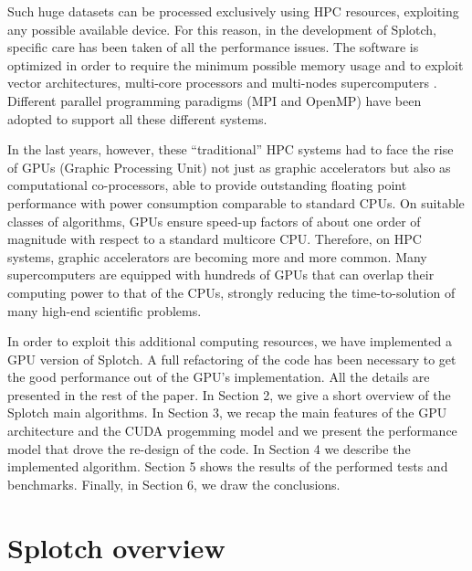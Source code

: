 \documentclass[11pt]{article}
\begin{document}

Such huge datasets can be processed exclusively using HPC resources, exploiting
any possible available device. For this reason, 
in the development of Splotch, specific care has been taken of all the performance 
issues. The software is optimized in order to require the minimum possible
memory usage and to exploit vector architectures, multi-core processors 
and multi-nodes supercomputers \cite{jin:high-performance}. Different parallel
programming paradigms (MPI and OpenMP) have been adopted to support all 
these different systems.

In the last years, however, these ``traditional'' HPC systems
had to face the rise of GPUs (Graphic Processing Unit) not just as graphic accelerators but 
also as computational co-processors, able to provide outstanding 
floating point performance with power consumption comparable to standard CPUs.
On suitable
classes of algorithms, GPUs ensure speed-up factors of about one order of magnitude with respect to 
a standard multicore CPU.
Therefore, on HPC systems, graphic accelerators are becoming more and more common. 
Many supercomputers are equipped with hundreds of GPUs that can overlap 
their computing power to that of the CPUs, strongly reducing the time-to-solution
of many high-end scientific problems.

In order to exploit this additional computing resources, we have implemented 
a GPU version of Splotch. A full refactoring of the code has been necessary 
to get the good performance out of the GPU's implementation. 
All the details are presented in the rest of the paper. In Section 2, we give a short 
overview of the Splotch main algorithms. In Section 3, we recap the main features
of the GPU architecture and the CUDA progemming model
and we present the performance model that drove the 
re-design of the code. In Section 4 
we describe the implemented algorithm. Section 5 shows
the results of the performed tests and benchmarks. Finally, in Section 6, we draw 
the conclusions. 

\section{Splotch overview}
\label{sec:overview}
\end{document}
